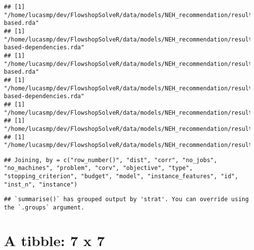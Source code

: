 \documentclass[
]{article}
\newenvironment{Shaded}{\begin{snugshade}}{\end{snugshade}}
\newcommand{\CommentTok}[1]{\textcolor[rgb]{0.56,0.35,0.01}{\textit{#1}}}
\newcommand{\DataTypeTok}[1]{\textcolor[rgb]{0.13,0.29,0.53}{#1}}
\newcommand{\FloatTok}[1]{\textcolor[rgb]{0.00,0.00,0.81}{#1}}
\newcommand{\KeywordTok}[1]{\textcolor[rgb]{0.13,0.29,0.53}{\textbf{#1}}}
\newcommand{\NormalTok}[1]{#1}
\newcommand{\OperatorTok}[1]{\textcolor[rgb]{0.81,0.36,0.00}{\textbf{#1}}}
\newcommand{\StringTok}[1]{\textcolor[rgb]{0.31,0.60,0.02}{#1}}
\begin{document}
\begin{verbatim}
## [1] "/home/lucasmp/dev/FlowshopSolveR/data/models/NEH_recommendation/results/decision_tree,instance-based.rda"
## [1] "/home/lucasmp/dev/FlowshopSolveR/data/models/NEH_recommendation/results/decision_tree,instance-based-dependencies.rda"
## [1] "/home/lucasmp/dev/FlowshopSolveR/data/models/NEH_recommendation/results/rand_forest,instance-based.rda"
## [1] "/home/lucasmp/dev/FlowshopSolveR/data/models/NEH_recommendation/results/rand_forest,instance-based-dependencies.rda"
## [1] "/home/lucasmp/dev/FlowshopSolveR/data/models/NEH_recommendation/results/none,default.rda"
## [1] "/home/lucasmp/dev/FlowshopSolveR/data/models/NEH_recommendation/results/none,global_best.rda"
## [1] "/home/lucasmp/dev/FlowshopSolveR/data/models/NEH_recommendation/results/none,random.rda"
\end{verbatim}

\begin{verbatim}
## Joining, by = c("row_number()", "dist", "corr", "no_jobs", "no_machines", "problem", "corv", "objective", "type", "stopping_criterion", "budget", "model", "instance_features", "id", "inst_n", "instance")
\end{verbatim}

\begin{Shaded}
\end{Shaded}

\begin{verbatim}
## `summarise()` has grouped output by 'strat'. You can override using the `.groups` argument.
\end{verbatim}

\hypertarget{a-tibble-7-x-7}{%
\section{A tibble: 7 x 7}\label{a-tibble-7-x-7}}
\end{document}

